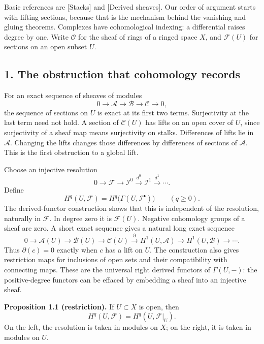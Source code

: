 \documentclass[11pt]{article}
\begin{document}
Basic references are {[}Stacks{]} and {[}Derived sheaves{]}. Our order
of argument starts with lifting sections, because that is the mechanism
behind the vanishing and gluing theorems. Complexes have cohomological
indexing: a differential raises degree by one. Write \(\mathcal O\) for
the sheaf of rings of a ringed space \(X\), and \(\mathcal F(U)\) for
sections on an open subset \(U\).

\subsection{1. The obstruction that cohomology
records}\label{the-obstruction-that-cohomology-records}

For an exact sequence of sheaves of modules \[
0\longrightarrow\mathcal A\longrightarrow\mathcal B
\longrightarrow\mathcal C\longrightarrow0,
\] the sequence of sections on \(U\) is exact at its first two terms.
Surjectivity at the last term need not hold. A section of
\(\mathcal C(U)\) has lifts on an open cover of \(U\), since
surjectivity of a sheaf map means surjectivity on stalks. Differences of
lifts lie in \(\mathcal A\). Changing the lifts changes those
differences by differences of sections of \(\mathcal A\). This is the
first obstruction to a global lift.

Choose an injective resolution \[
0\longrightarrow\mathcal F\longrightarrow\mathcal I^0
\xrightarrow{d^0}\mathcal I^1\xrightarrow{d^1}\cdots.
\] Define \[
H^q(U,\mathcal F)
=H^q\bigl(\Gamma(U,\mathcal I^\bullet)\bigr)
\qquad(q\geq0).
\] The derived-functor construction shows that this is independent of
the resolution, naturally in \(\mathcal F\). In degree zero it is
\(\mathcal F(U)\). Negative cohomology groups of a sheaf are zero. A
short exact sequence gives a natural long exact sequence \[
0\to\mathcal A(U)\to\mathcal B(U)\to\mathcal C(U)
\xrightarrow{\partial}H^1(U,\mathcal A)
\to H^1(U,\mathcal B)\to\cdots.
\] Thus \(\partial(c)=0\) exactly when \(c\) has a lift on \(U\). The
construction also gives restriction maps for inclusions of open sets and
their compatibility with connecting maps. These are the universal right
derived functors of \(\Gamma(U,-)\): the positive-degree functors can be
effaced by embedding a sheaf into an injective sheaf.

\textbf{Proposition 1.1 (restriction).} If \(U\subset X\) is open, then
\[
H^q(U,\mathcal F)=H^q(U,\mathcal F|_U).
\] On the left, the resolution is taken in modules on \(X\); on the
right, it is taken in modules on \(U\).
\end{document}
